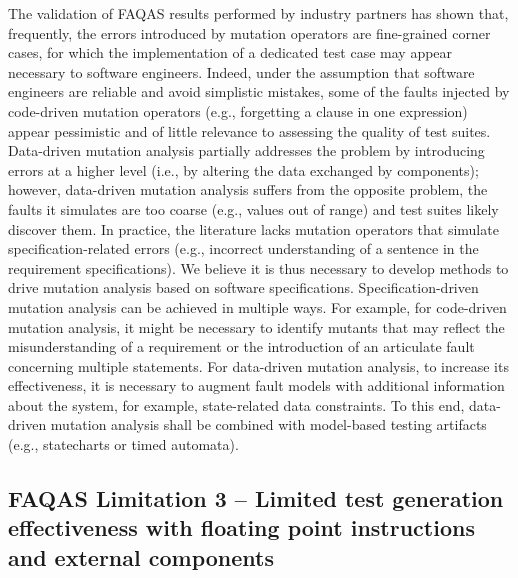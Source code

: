 The validation of FAQAS results performed by industry partners has shown that, frequently, the errors introduced by mutation operators are fine-grained corner cases, for which the implementation of a dedicated test case may appear necessary to software engineers. Indeed, under the assumption that software engineers are reliable and avoid simplistic mistakes, some of the faults injected by code-driven mutation operators (e.g., forgetting a clause in one expression) appear pessimistic and of little relevance to assessing the quality of test suites. Data-driven mutation analysis partially addresses the problem by introducing errors at a higher level (i.e., by altering the data exchanged by components); however, data-driven mutation analysis suffers from the opposite problem, the faults it simulates are too coarse (e.g., values out of range) and test suites likely discover them. In practice, the literature lacks mutation operators that simulate specification-related errors (e.g., incorrect understanding of a sentence in the requirement specifications). We believe it is thus necessary to develop methods to drive mutation analysis based on software specifications. Specification-driven mutation analysis can be achieved in multiple ways. For example, for code-driven mutation analysis, it might be necessary to identify mutants that may reflect the misunderstanding of a requirement or the introduction of an articulate fault concerning multiple statements. For data-driven mutation analysis, to increase its effectiveness, it is necessary to augment fault models with additional information about the system, for example, state-related data constraints. To this end, data-driven mutation analysis shall be combined with model-based testing artifacts (e.g., statecharts or timed automata).

\subsection{FAQAS Limitation 3 – Limited test generation effectiveness with floating point instructions and external components}

